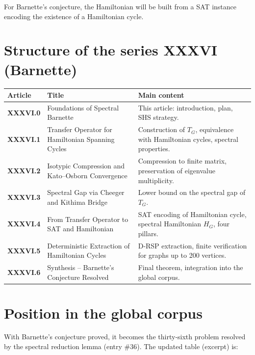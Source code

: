 \documentclass[11pt,a4paper]{article}
\begin{document}
For Barnette's conjecture, the Hamiltonian will be built from a SAT instance encoding the existence of a Hamiltonian cycle.

\section{Structure of the series XXXVI (Barnette)}

\begin{center}
\small
\begin{tabular}{@{}>{\bfseries}l>{\raggedright\arraybackslash}p{4.5cm}>{\raggedright\arraybackslash}p{6cm}@{}}
\toprule
\textbf{Article} & \textbf{Title} & \textbf{Main content} \\
\midrule
XXXVI.0 & Foundations of Spectral Barnette & This article: introduction, plan, SHS strategy. \\
XXXVI.1 & Transfer Operator for Hamiltonian Spanning Cycles & Construction of \(T_G\), equivalence with Hamiltonian cycles, spectral properties. \\
XXXVI.2 & Isotypic Compression and Kato–Osborn Convergence & Compression to finite matrix, preservation of eigenvalue multiplicity. \\
XXXVI.3 & Spectral Gap via Cheeger and Kithima Bridge & Lower bound on the spectral gap of \(T_G\). \\
XXXVI.4 & From Transfer Operator to SAT and Hamiltonian & SAT encoding of Hamiltonian cycle, spectral Hamiltonian \(H_G\), four pillars. \\
XXXVI.5 & Deterministic Extraction of Hamiltonian Cycles & D‑RSP extraction, finite verification for graphs up to 200 vertices. \\
XXXVI.6 & Synthesis – Barnette's Conjecture Resolved & Final theorem, integration into the global corpus. \\
\bottomrule
\end{tabular}
\normalsize
\end{center}

\section{Position in the global corpus}

With Barnette's conjecture proved, it becomes the thirty‑sixth problem resolved by the spectral reduction lemma (entry \#36). The updated table (excerpt) is:
\end{document}
